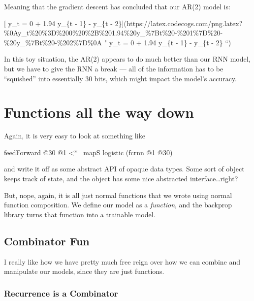 \documentclass[]{article}
\newenvironment{Shaded}{}{}
\newcommand{\DecValTok}[1]{\textcolor[rgb]{0.25,0.63,0.44}{#1}}
\newcommand{\FunctionTok}[1]{\textcolor[rgb]{0.02,0.16,0.49}{#1}}
\newcommand{\NormalTok}[1]{#1}
\begin{document}
Meaning that the gradient descent has concluded that our AR(2) model is:

{[} y\_t = 0 + 1.94 y\_\{t - 1\} - y\_\{t -
2\}{]}(https://latex.codecogs.com/png.latex?\%0Ay\_t\%20\%3D\%200\%20\%2B\%201.94\%20y\_\%7Bt\%20-\%201\%7D\%20-\%20y\_\%7Bt\%20-\%202\%7D\%0A
" y\_t = 0 + 1.94 y\_\{t - 1\} - y\_\{t - 2\} ``)

In this toy situation, the AR(2) appears to do much better than our RNN model,
but we have to give the RNN a break --- all of the information has to be
``squished'' into essentially 30 bits, which might impact the model's accuracy.

\hypertarget{functions-all-the-way-down}{%
\section{Functions all the way down}\label{functions-all-the-way-down}}

Again, it is very easy to look at something like

\begin{Shaded}
\begin{Highlighting}[]
\NormalTok{feedForward }\FunctionTok{@}\DecValTok{30} \FunctionTok{@}\DecValTok{1} \FunctionTok{<*~}\NormalTok{ mapS logistic (fcrnn }\FunctionTok{@}\DecValTok{1} \FunctionTok{@}\DecValTok{30}\NormalTok{)}
\end{Highlighting}
\end{Shaded}

and write it off as some abstract API of opaque data types. Some sort of object
keeps track of state, and the object has some nice abstracted
interface\ldots{}right?

But, nope, again, it is all just normal functions that we wrote using normal
function composition. We define our model as a \emph{function}, and the backprop
library turns that function into a trainable model.

\hypertarget{combinator-fun}{%
\subsection{Combinator Fun}\label{combinator-fun}}

I really like how we have pretty much free reign over how we can combine and
manipulate our models, since they are just functions.

\hypertarget{recurrence-is-a-combinator}{%
\subsubsection{Recurrence is a Combinator}\label{recurrence-is-a-combinator}}
\end{document}
